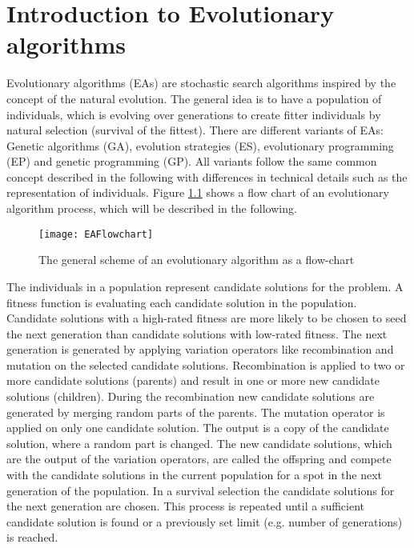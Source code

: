 \newpage
\chapter{Introduction to Evolutionary algorithms}
\label{sec:EA}
Evolutionary algorithms (EAs) are stochastic search algorithms inspired by the concept of the natural evolution. The general idea is to have a population of individuals, which is evolving over generations to create fitter individuals by natural selection (survival of the fittest). There are different variants of EAs: Genetic algorithms (GA), evolution strategies (ES), evolutionary programming (EP) and genetic programming (GP). All variants follow the same common concept described in the following with differences in technical details such as the representation of individuals\cite{Eiben}. Figure \ref{fig:eaflowchart} shows a flow chart of an evolutionary algorithm process, which will be described in the following.

\begin{figure}[H]
	\centering
	\texttt{[image: EAFlowchart]}
	\caption{The general scheme of an evolutionary algorithm as a flow-chart \cite{Eiben}}
	\label{fig:eaflowchart}
\end{figure}

The individuals in a population represent candidate solutions for the problem. A fitness function is evaluating each candidate solution in the population. Candidate solutions with a high-rated fitness are more likely to be chosen to seed the next generation than candidate solutions with low-rated fitness. The next generation is generated by applying variation operators like recombination and mutation on the selected candidate solutions. Recombination is applied to two or more candidate solutions (parents) and result in one or more new candidate solutions (children). During the recombination new candidate solutions are generated by merging random parts of the parents. The mutation operator is applied on only one candidate solution. The output is a copy of the candidate solution, where a random part is changed. The new candidate solutions, which are the output of the variation operators, are called the offspring and compete with the candidate solutions in the current population for a spot in the next generation of the population. In a survival selection the candidate solutions for the next generation are chosen. This process is repeated until a sufficient candidate solution is found or a previously set limit (e.g. number of generations) is reached.

